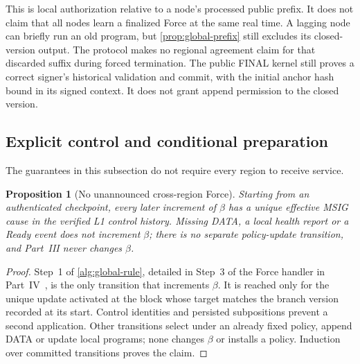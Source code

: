 \documentclass[11pt,a4paper]{article}
\newtheorem{proposition}[proposition]{Proposition}
\newcounter{protocol}
\begin{document}
This is local authorization relative to a node's processed public
prefix. It does not claim that all nodes learn a finalized Force at the
same real time. A lagging node can briefly run an old program, but
\cref{prop:global-prefix} still excludes its closed-version output.
The protocol makes no regional agreement claim for that discarded
suffix during forced termination. The public FINAL kernel still proves
a correct signer's historical validation and commit, with the initial
anchor hash bound in its signed context. It does not grant append
permission to the closed version.
\subsection{Explicit control and conditional preparation}
\label{sec:liveness}
The guarantees in this subsection do not require every region to receive
service.

\begin{proposition}[No unannounced cross-region Force]
\label{prop:explicit-force}
Starting from an authenticated checkpoint, every later increment of
$\beta$ has a unique effective MSIG cause in the verified L1 control
history. Missing DATA, a local health report or a Ready event does not
increment $\beta$; there is no separate policy-update transition, and
Part~III never changes $\beta$.
\end{proposition}
\begin{proof}
Step~1 of \cref{alg:global-rule}, detailed in Step~3 of
the Force handler in Part~IV~\cite{part4}, is the only transition that increments $\beta$.
It is reached only for the unique update activated at the block
whose target matches the branch version recorded at its start. Control identities
and persisted subpositions prevent a second application. Other
transitions select under an already fixed policy, append DATA or update
local programs; none changes $\beta$ or installs a policy. Induction over committed
transitions proves the claim.
\end{proof}
\end{document}
